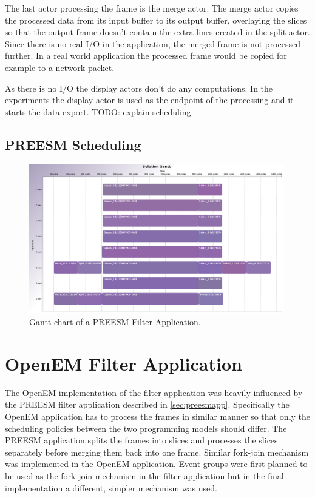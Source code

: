 The last actor processing the frame is the merge actor. The merge actor copies
the processed data from its input buffer to its output buffer, overlaying the
slices so that the output frame doesn't contain the extra lines created in the
split actor. Since there is no real I/O in the application, the merged frame is
not processed further. In a real world application the processed frame would be
copied for example to a network packet.

As there is no I/O the display actors don't do any computations. In the
experiments the display actor is used as the endpoint of the processing and it
starts the data export.
TODO: explain scheduling
\subsection{PREESM Scheduling}

\begin{figure}[h!] \label{preesm_gantt} \begin{center}
    \includegraphics[width=0.99\textwidth]{images/gantt_preesm_cifcif.png}
    \caption{Gantt chart of a PREESM Filter Application.} \end{center}
\end{figure}

\section{OpenEM Filter Application}
The OpenEM implementation of the filter application was heavily influenced by
the PREESM filter application described in \ref{sec:preesmapp}. Specifically the
OpenEM application has to process the frames in similar manner so that only the
scheduling policies between the two programming models should differ. The PREESM
application splits the frames into slices and processes the slices separately
before merging them back into one frame. Similar fork-join mechanism was
implemented in the OpenEM application. Event groups were first planned to be
used as the fork-join mechanism in the filter application but in the final
implementation a different, simpler mechanism was used.

